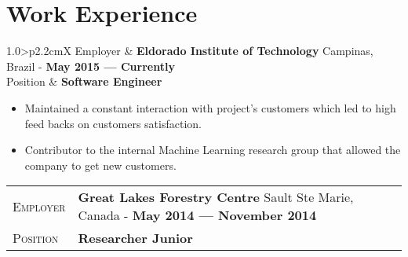 \documentclass[10pt, a4paper, oneside, final]{scrartcl} %
\newcommand{\gray}{\rowcolor[gray]{.90}} %
\begin{document}


\section{Work Experience}

\begin{center}
\begin{tabularx}{1.0\linewidth}{>{\raggedleft\scshape}p{2.2cm}X}
\gray Employer & \textbf{Eldorado Institute of Technology} \hfill Campinas, Brazil - \textbf{May 2015 --- Currently}\\
\gray Position & \textbf{Software Engineer}\\
\end{tabularx}
\end{center}

\begin{itemize}\itemsep1.0pt
\item Maintained a constant interaction with project's customers which led to high feed backs on customers satisfaction.



\item Contributor to the internal Machine Learning research group that allowed the company to get new customers. 
\end{itemize}

\begin{center}
\begin{tabularx}{1.0\linewidth}{>{\raggedleft\scshape}p{2.2cm}X}
\gray Employer & \textbf{Great Lakes Forestry Centre } \hfill Sault Ste Marie, Canada - \textbf{May 2014 --- November 2014}\\
\gray Position & \textbf{Researcher Junior}\\
\end{tabularx}
\end{center}
\end{document}
